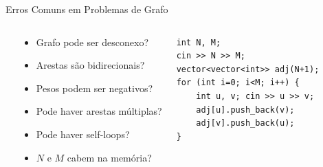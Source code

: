 \documentclass[aspectratio=169,10pt]{beamer}
\begin{document}
\begin{frame}[fragile]{Erros Comuns em Problemas de Grafo}
\begin{columns}[t]
\begin{tcolorbox}[caixaAmarelo,title={Armadilha: índice 0 vs 1}]
      \end{tcolorbox}
      \vspace{0.08cm}
      \begin{tcolorbox}[caixaGrafo,title={Verificar antes de submeter}]
        \begin{itemize}\footnotesize
          \item Grafo pode ser desconexo?
          \item Arestas são bidirecionais?
          \item Pesos podem ser negativos?
          \item Pode haver arestas múltiplas?
          \item Pode haver self-loops?
          \item $N$ e $M$ cabem na memória?
        \end{itemize}
      \end{tcolorbox}
      \vspace{0.08cm}
      \begin{tcolorbox}[caixaVerde,title={Dica: template padrão}]
        \footnotesize
        \begin{lstlisting}[style=cppsmall,numbers=none]
int N, M;
cin >> N >> M;
vector<vector<int>> adj(N+1);
for (int i=0; i<M; i++) {
    int u, v; cin >> u >> v;
    adj[u].push_back(v);
    adj[v].push_back(u);
}
        \end{lstlisting}
      \end{tcolorbox}
  \end{columns}
\end{frame}
\end{document}
